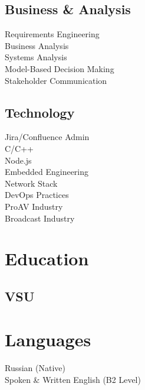 \documentclass[]{external}
\begin{document}
\begin{paracol}{2}
    \subsection{Business \& Analysis}
    \vspace{\topsep}
    \textbullet{} Requirements Engineering \\
    \textbullet{} Business Analysis \\
    \textbullet{} Systems Analysis \\
    \textbullet{} Model-Based Decision Making \\
    \textbullet{} Stakeholder Communication
    \sectionsep
    
    \subsection{Technology}
    \vspace{\topsep}
    \textbullet{} Jira/Confluence Admin \\
    \textbullet{} C/C++ \\
    \textbullet{} Node.js \\
    \textbullet{} Embedded Engineering \\
    \textbullet{} Network Stack \\
    \textbullet{} DevOps Practices \\
    \textbullet{} ProAV Industry \\
    \textbullet{} Broadcast Industry
    
    
    \section{Education} 
    \subsection{VSU}
    \sectionsep
    
    
    \section{Languages} 
    \textbullet{} Russian (Native) \\ 
    \textbullet{} Spoken \& Written English (B2 Level)
    \sectionsep
    \\[8pt]
    

\end{paracol}
\end{document}
